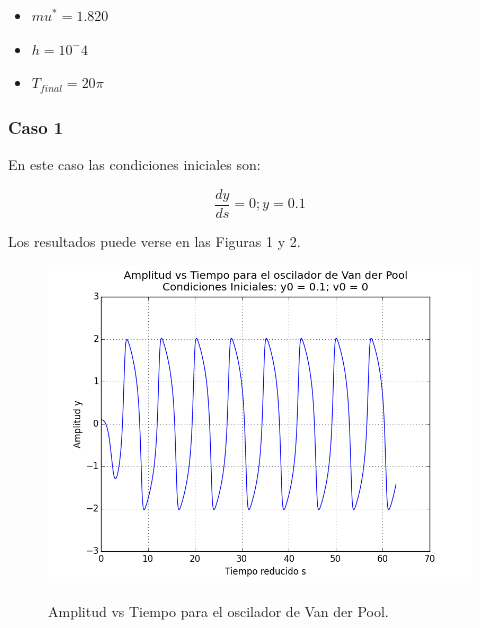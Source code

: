 \documentclass{article}
\begin{document}
\begin{itemize}
  \item $ mu^* = 1.820 $
  \item $h = 10^-4$
  \item $T_{final} = 20\pi$ 
\end{itemize} 

\subsubsection{Caso 1}

En este caso las condiciones iniciales son:

\begin{equation}
\dfrac{dy}{ds} = 0; y = 0.1
\label{eq:cond_inicial_1}  
\end{equation}
\vspace{0.1cm}

Los resultados puede verse en las Figuras 1 y 2.

\begin{figure}[h]
  \centering
  \includegraphics[scale = 0.5]{images/ampl_vs_tiempo_01-0.png}
  \label{}
  \caption{Amplitud vs Tiempo para el oscilador de Van der Pool.}
\end{figure}
\end{document}
